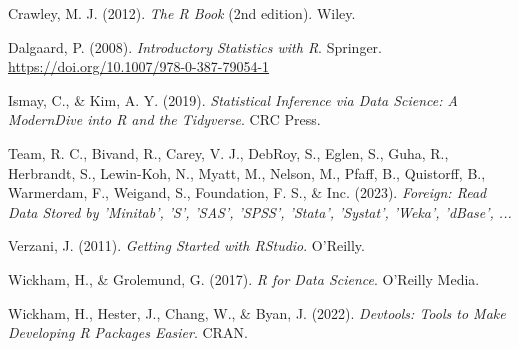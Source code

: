 \documentclass[a4paper, nobind]{templates/ociamthesis}
\newlength{\cslhangindent}
\newenvironment{CSLReferences}[2] %
 {%
  \setlength{\parindent}{0pt}
  \ifodd #1
  \let\oldpar\par
  \def\par{\hangindent=\cslhangindent\oldpar}
  \fi
  \setlength{\parskip}{1mm}
  \setlength{\baselineskip}{6mm}
 }%
 {}
\begin{document}
\hypertarget{refs}{}
\begin{CSLReferences}{1}{0}
\leavevmode{}%
Crawley, M. J. (2012). \emph{The {R Book}} (2nd edition). {Wiley}.

\leavevmode{}%
Dalgaard, P. (2008). \emph{Introductory {Statistics} with {R}}. {Springer}. \url{https://doi.org/10.1007/978-0-387-79054-1}

\leavevmode{}%
Ismay, C., \& Kim, A. Y. (2019). \emph{Statistical {Inference} via {Data Science}: {A ModernDive} into {R} and the {Tidyverse}}. {CRC Press}.

\leavevmode{}%
Team, R. C., Bivand, R., Carey, V. J., DebRoy, S., Eglen, S., Guha, R., Herbrandt, S., Lewin-Koh, N., Myatt, M., Nelson, M., Pfaff, B., Quistorff, B., Warmerdam, F., Weigand, S., Foundation, F. S., \& Inc. (2023). \emph{Foreign: {Read Data Stored} by '{Minitab}', '{S}', '{SAS}', '{SPSS}', '{Stata}', '{Systat}', '{Weka}', '{dBase}', ...}

\leavevmode{}%
Verzani, J. (2011). \emph{Getting {Started} with {RStudio}}. {O'Reilly}.

\leavevmode{}%
Wickham, H., \& Grolemund, G. (2017). \emph{R for {Data Science}}. {O'Reilly Media}.

\leavevmode{}%
Wickham, H., Hester, J., Chang, W., \& Byan, J. (2022). \emph{Devtools: {Tools} to {Make Developing R Packages Easier}}. CRAN.

\end{CSLReferences}

\end{document}
